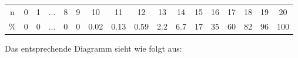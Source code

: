 \begin{tabular}{c|cccccccccccccccc}
  n  & 0 & 1 & ... & 8 & 9 & 10  & 11   & 12   & 13  & 14  & 15 & 16 &  17 & 18 & 19 &  20\\
  \% & 0 & 0 & ... & 0 & 0 &  0.02  &0.13   & 0.59 & 2.2 & 6.7 & 17 & 35 &  60 & 82 & 96 & 100
\end{tabular}

Das entsprechende Diagramm sieht wie folgt aus:

\newpage



